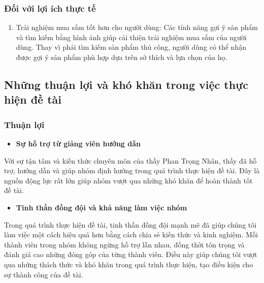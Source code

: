\subsubsection{Đối với lợi ích thực tế}
\begin{enumerate}[-]
    \item Trải nghiệm mua sắm tốt hơn cho người dùng: Các tính năng gợi ý sản phẩm và tìm kiếm bằng hình ảnh giúp cải thiện trải nghiệm mua sắm của người dùng. Thay vì phải tìm kiếm sản phẩm thủ công, người dùng có thể nhận được gợi ý sản phẩm phù hợp dựa trên sở thích và lựa chọn của họ.
\end{enumerate}
\subsection{Những thuận lợi và khó khăn trong việc thực hiện đề tài}
\subsubsection{Thuận lợi}
\begin{itemize}
    \item \textbf{Sự hỗ trợ từ giảng viên hướng dẫn}
\end{itemize}
  Với sự tận tâm và kiến thức chuyên môn của thầy Phan Trọng Nhân, thầy đã hỗ trợ, hướng dẫn và giúp nhóm định hướng trong quá trình thực hiện đề tài. Đây là nguồn động lực rất lớn giúp nhóm vượt qua những khó khăn để hoàn thành tốt đề tài.
 
\begin{itemize}
    \item \textbf{Tinh thần đồng đội và khả năng làm việc nhóm}
\end{itemize}
Trong quá trình thực hiện đề tài, tinh thần đồng đội mạnh mẽ đã giúp chúng tôi làm việc một cách hiệu quả hơn bằng cách chia sẻ kiến thức và kinh nghiệm. Mỗi thành viên trong nhóm không ngừng hỗ trợ lẫn nhau, đồng thời tôn trọng và đánh giá cao những đóng góp của từng thành viên. Điều này giúp chúng tôi vượt qua những thách thức và khó khăn trong quá trình thực hiện, tạo điều kiện cho sự thành công của đề tài.
